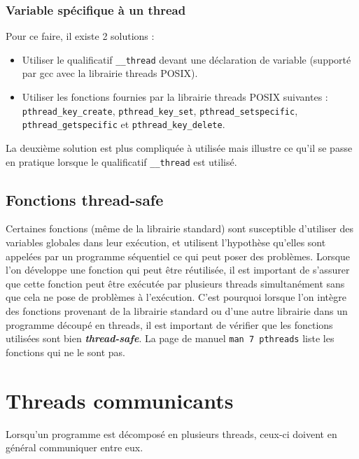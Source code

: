 \subsubsection{Variable spécifique à un thread}
Pour ce faire, il existe 2 solutions :
\begin{itemize}
  \item Utiliser le qualificatif \texttt{\_\_thread} devant une déclaration de variable (supporté par gcc avec la librairie threads POSIX).
  \item Utiliser les fonctions fournies par la librairie threads POSIX suivantes : \texttt{pthread\_key\_create}, \texttt{pthread\_key\_set}, \texttt{pthread\_setspecific}, \texttt{pthread\_getspecific} et \texttt{pthread\_key\_delete}.
\end{itemize}
La deuxième solution est plus compliquée à utilisée mais illustre ce qu'il se passe en pratique lorsque le qualificatif \texttt{\_\_thread} est utilisé.

\subsection{Fonctions thread-safe}
Certaines fonctions (même de la librairie standard) sont susceptible d'utiliser des variables globales dans leur exécution, et utilisent l'hypothèse qu'elles sont appelées par un programme séquentiel ce qui peut poser des problèmes.
Lorsque l'on développe une fonction qui peut être réutilisée, il est important de s'assurer que cette fonction peut être exécutée par plusieurs threads simultanément sans que cela ne pose de problèmes à l'exécution.
C'est pourquoi lorsque l'on intègre des fonctions provenant de la librairie standard ou d'une autre librairie dans un programme découpé en threads, il est important de vérifier que les fonctions utilisées sont bien \textbf{\textit{thread-safe}}.
La page de manuel \texttt{man 7 pthreads} liste les fonctions qui ne le sont pas.



\section{Threads communicants}
Lorsqu'un programme est décomposé en plusieurs threads, ceux-ci doivent en général communiquer entre eux.

